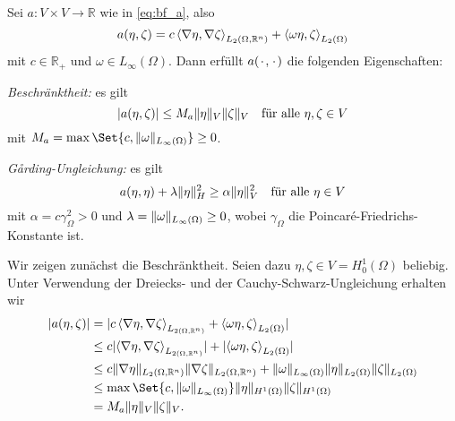 \begin{Lemma}
\label{lemma:a_bf_bounded_garding}
    Sei $a \colon V \times V \to \mathbb{R}$ wie in \eqref{eq:bf_a}, also
    \begin{equation}
        a(\eta, \zeta) = c \left\langle\nabla \eta,\nabla \zeta\right\rangle_{L_{2}(\Omega, \mathbb{R}^{n})} + \left\langle\omega \eta,\zeta\right\rangle_{L_{2}(\Omega)}
    \end{equation}
    mit $c \in \mathbb{R}_{+}$ und $\omega \in L_{\infty}(\Omega)$.
    Dann erfüllt $a({\mkern2mu\cdot\mkern2mu}, {\mkern2mu\cdot\mkern2mu})$ die folgenden Eigenschaften:
    \begin{thmenumerate}
        \item\label{lemma:a_bf_bounded_garding:1}
        \emph{Beschränktheit:} es gilt
        \begin{equation}
            \lvert a(\eta, \zeta)\rvert \leq M_{a} \lVert\eta\rVert_{V} \lVert\zeta\rVert_{V} \quad \text{für alle}~\eta, \zeta \in V
        \end{equation}
        mit $M_{a} = \max\Set{c, \norm{\omega}_{L_{\infty}(\Omega)} } \geq 0$.
        \item\label{lemma:a_bf_bounded_garding:2}
        \emph{G\aa{}rding-Ungleichung:} es gilt
        \begin{equation}
                a(\eta, \eta) + \lambda \lVert\eta\rVert_{H}^{2} \geq \alpha \lVert\eta\rVert_{V}^{2} \quad \text{für alle}~\eta \in V
        \end{equation}
        mit $\alpha = c \gamma_{\Omega}^{2} > 0$ und $\lambda = \lVert\omega\rVert_{L_{\infty}(\Omega)} \geq 0$, wobei $\gamma_{\Omega}$ die Poincaré-Friedrichs-Konstante ist.
    \end{thmenumerate}

    \begin{Beweis}
    Wir zeigen zunächst die Beschränktheit.
    Seien dazu $\eta, \zeta \in V = H^{1}_{0}(\Omega)$ beliebig.
    Unter Verwendung der Dreiecks- und der Cauchy-Schwarz-Ungleichung erhalten wir
    \begin{align}
        \abs{a(\eta, \zeta)}
        &= \abs{c \skprod{\grad \eta}{\grad \zeta}_{L_{2(\Omega, \mathbb{R}^{n})}} + \skprod{\omega \eta}{\zeta}_{L_{2}(\Omega)}}
        \\&\leq c \abs{\skprod{\grad \eta}{\grad \zeta}_{L_{2(\Omega, \mathbb{R}^{n})}}} + \abs{\skprod{\omega \eta}{\zeta}_{L_{2}(\Omega)}}
        \\&\leq c \norm{\grad \eta}_{L_{2}(\Omega, \mathbb{R}^{n})} \norm{\grad \zeta}_{L_{2}(\Omega, \mathbb{R}^{n})} + \norm{\omega}_{L_{\infty}(\Omega)} \norm{\eta}_{L_{2}(\Omega)} \norm{\zeta}_{L_{2}(\Omega)}
        \\&\leq \max \Set{ c, \norm{\omega}_{L_{\infty}(\Omega)} } \norm{\eta}_{H^{1}(\Omega)} \norm{\zeta}_{H^{1}(\Omega)}
        \\&= M_{a} \norm{\eta}_{V} \norm{\zeta}_{V}.
    \end{align}


\end{Beweis}
\end{Lemma}
